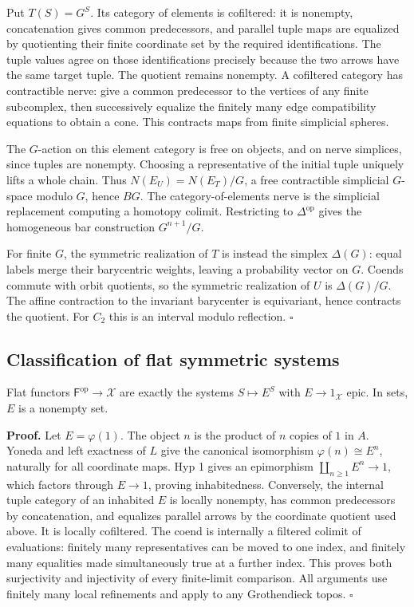 \documentclass[11pt,a4paper]{article}
\theoremstyle{definition}
\begin{document}
Put \(T(S)=G^S\). Its category of elements is cofiltered: it is
nonempty, concatenation gives common predecessors, and parallel tuple
maps are equalized by quotienting their finite coordinate set by the
required identifications. The tuple values agree on those
identifications precisely because the two arrows have the same target
tuple. The quotient remains nonempty. A cofiltered category has
contractible nerve: give a common predecessor to the vertices of any
finite subcomplex, then successively equalize the finitely many edge
compatibility equations to obtain a cone. This contracts maps from
finite simplicial spheres.

The \(G\)-action on this element category is free on objects, and on
nerve simplices, since tuples are nonempty. Choosing a representative of
the initial tuple uniquely lifts a whole chain. Thus
\(N(E_U)=N(E_T)/G\), a free contractible simplicial \(G\)-space modulo
\(G\), hence \(BG\). The category-of-elements nerve is the simplicial
replacement computing a homotopy colimit. Restricting to
\(\Delta^{\mathrm{op}}\) gives the homogeneous bar construction
\(G^{n+1}/G\).

For finite \(G\), the symmetric realization of \(T\) is instead the
simplex \(\Delta(G)\): equal labels merge their barycentric weights,
leaving a probability vector on \(G\). Coends commute with orbit
quotients, so the symmetric realization of \(U\) is \(\Delta(G)/G\). The
affine contraction to the invariant barycenter is equivariant, hence
contracts the quotient. For \(C_2\) this is an interval modulo
reflection. \(\square\)

\subsection{Classification of flat symmetric
systems}\label{b5.4.-classification-of-flat-symmetric-systems}

Flat functors
\(\mathsf F^{\mathrm{op}}\to\mathcal X\) are exactly the systems
\(S\mapsto E^S\) with \(E\to1_{\mathcal X}\) epic. In sets, \(E\) is a
nonempty set.

\textbf{Proof.} Let \(E=\varphi(1)\). The object \(n\) is the product of
\(n\) copies of \(1\) in \(A\). Yoneda and left exactness of \(L\) give
the canonical isomorphism \(\varphi(n)\cong E^n\), naturally for all
coordinate maps. Hyp 1 gives an epimorphism \(\coprod_{n\ge1}E^n\to1\),
which factors through \(E\to1\), proving inhabitedness. Conversely, the
internal tuple category of an inhabited \(E\) is locally nonempty, has
common predecessors by concatenation, and equalizes parallel arrows by
the coordinate quotient used above. It is locally cofiltered. The coend
is internally a filtered colimit of evaluations: finitely many
representatives can be moved to one index, and finitely many equalities
made simultaneously true at a further index. This proves both
surjectivity and injectivity of every finite-limit comparison. All
arguments use finitely many local refinements and apply to any
Grothendieck topos. \(\square\)
\end{document}
